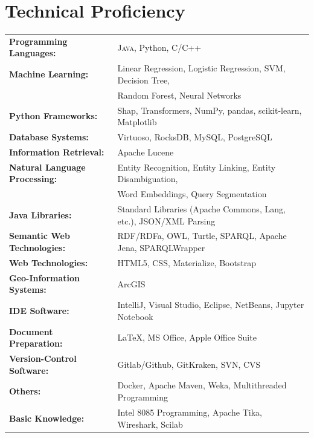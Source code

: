 \documentclass[a4paper,10pt]{article} %
\begin{document}

\section{Technical Proficiency}

\begin{tabular}{ll}
\textbf{Programming Languages:} & \textsc{Java}, Python, \textsc{C/C++}\\
\textbf{Machine Learning:} & Linear Regression, Logistic Regression, SVM, Decision Tree,\\
						   & Random Forest, Neural Networks \\
\textbf{Python Frameworks:} & Shap, Transformers, NumPy, pandas, scikit-learn, Matplotlib \\
\textbf{Database Systems:} & Virtuoso, RocksDB, My\textsc{SQL}, Postgre\textsc{SQL}\\
\textbf{Information Retrieval:} & Apache Lucene\\
\textbf{Natural Language Processing:} & Entity Recognition, Entity Linking, Entity Disambiguation,\\
									  & Word Embeddings, Query Segmentation\\
\textbf{Java Libraries:} & Standard Libraries (Apache Commons, Lang, etc.), JSON/XML Parsing\\
\textbf{Semantic Web Technologies:} & RDF/RDFa, \textsc{OWL}, Turtle, \textsc{SPARQL}, Apache Jena, SPARQLWrapper\\
\textbf{Web Technologies:} & HTML5, CSS, Materialize, Bootstrap\\
\textbf{Geo-Information Systems:} & ArcGIS\\
\textbf{IDE Software:} & IntelliJ, Visual Studio, Eclipse, NetBeans, Jupyter Notebook\\
\textbf{Document Preparation:} & LaTeX, MS Office, Apple Office Suite\\
\textbf{Version-Control Software:} & Gitlab/Github, GitKraken, \textsc{SVN}, \textsc{CVS}\\
\textbf{Others:} & Docker, Apache Maven, Weka, Multithreaded Programming\\
\textbf{Basic Knowledge:} & Intel 8085 Programming,  Apache Tika, Wireshark, Scilab\\
\end{tabular}
\\
\vspace{-0.5em}
\end{document}
